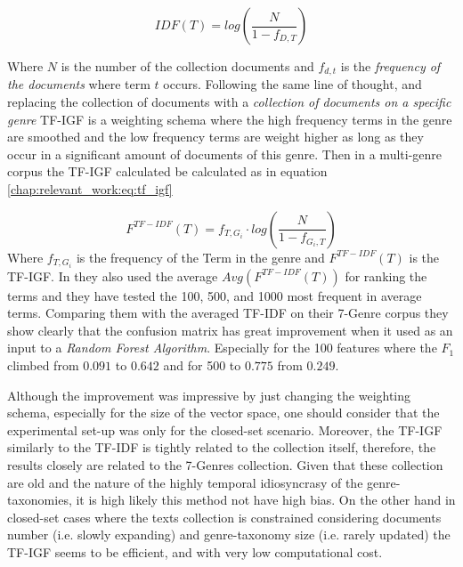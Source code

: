  \begin{equation}\label{chap:relevant_work:eq:idf}
 	IDF(T) = log \left( \frac{N}{1 - f_{D,T}} \right)
 \end{equation}
 
 Where $N$ is the number of the collection documents and $f_{d,t}$ is the \textit{frequency of the documents} where term $t$ occurs. Following the same line of thought, and replacing the collection of documents with a \textit{collection of documents on a specific genre} TF-IGF is a weighting schema where the high frequency terms in the genre are smoothed and the low frequency terms are weight higher as long as they occur in a significant amount of documents of this genre. Then in a multi-genre corpus the TF-IGF calculated be calculated as in equation \ref{chap:relevant_work:eq:tf_igf}

 \begin{equation}\label{chap:relevant_work:eq:tf_igf}
 	F^{TF-IDF}(T) = f_{T,G_{i}} \cdot log \left( \frac{N}{1 - f_{G_{i},T}} \right)
 \end{equation}
Where $f_{T,G_{i}}$ is the frequency of the Term in the genre and $F^{TF-IDF}(T)$  is the TF-IGF. In  \parencite{sugiyanto2014term} they also used the average $Avg(F^{TF-IDF}(T))$ for ranking the terms and they have tested the 100, 500, and 1000 most frequent in average terms. Comparing them with the averaged TF-IDF on their 7-Genre corpus they show clearly that the confusion matrix has great improvement when it used as an input to a \textit{Random Forest Algorithm}.  Especially for the 100 features where the $F_{1}$ climbed from $0.091$ to $0.642$ and for 500 to $0.775$ from $0.249$.

Although the improvement was impressive by just changing the weighting schema, especially for  the size of the vector space, one should consider that the experimental set-up was only for the closed-set scenario. Moreover, the TF-IGF similarly to the TF-IDF is tightly related to the collection itself, therefore, the results closely are related to the 7-Genres collection. Given that these collection are old and the nature of the highly temporal idiosyncrasy of the genre-taxonomies, it is high likely this method not have high bias. On the other hand in closed-set cases where the texts collection is constrained considering documents number (i.e. slowly expanding) and genre-taxonomy size (i.e. rarely updated) the TF-IGF seems to be efficient, and with very low computational cost.  


